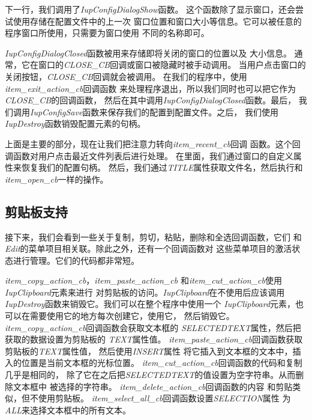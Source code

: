 \documentclass{ctexart}
\begin{document}
下一行，我们调用了\emph{IupConfigDialogShow}函数。
这个函数除了显示窗口，还会尝试使用存储在配置文件中的上一次
窗口位置和窗口大小等信息。它可以被任意的程序窗口所使用，只需要为窗口使用
不同的名称即可。

\emph{IupConfigDialogClosed}函数被用来存储即将关闭的窗口的位置以及
大小信息。
通常，它在窗口的\emph{CLOSE\_CB}回调或窗口被隐藏时被手动调用。
当用户点击窗口的关闭按钮，\emph{CLOSE\_CB}回调就会被调用。
在我们的程序中，使用\emph{item\_exit\_action\_cb}回调函数
来处理程序退出，所以我们同时也可以把它作为\emph{CLOSE\_CB}的回调函数，
然后在其中调用\emph{IupConfigDialogClosed}函数。最后，
我们调用\emph{IupConfigSave}函数来保存我们的配置到配置文件。之后，
我们使用\emph{IupDestroy}函数销毁配置元素的句柄。

上面是主要的部分，现在让我们把注意力转向\emph{item\_recent\_cb}回调
函数。这个回调函数对用户点击最近文件列表后进行处理。
在里面，我们通过窗口的自定义属性来恢复我们的配置句柄。
然后，我们通过\emph{TITLE}属性获取文件名，然后执行和
\emph{item\_open\_cb}一样的操作。

\subsection{剪贴板支持}

接下来，我们会看到一些关于复制，剪切，粘贴，删除和全选回调函数，它们
和\emph{Edit}的菜单项目相关联。除此之外，还有一个回调函数对
这些菜单项目的激活状态进行管理。它们的代码都非常短。

\emph{item\_copy\_action\_cb}，\emph{item\_paste\_action\_cb}
和\emph{item\_cut\_action\_cb}使用\emph{IupClipboard}元素来进行
对剪贴板的访问。\emph{IupClipboard}在不使用后应该调用
\emph{IupDestroy}函数来销毁它。我们可以在整个程序中使用一个
\emph{IupClipboard}元素，也可以在需要使用它的地方每次创建它，使用它，
然后销毁它。
\emph{item\_copy\_action\_cb}回调函数会获取文本框的
\emph{SELECTEDTEXT}属性，然后把获取的数据设置为剪贴板的
\emph{TEXT}属性值。
\emph{item\_paste\_action\_cb}回调函数获取剪贴板的\emph{TEXT}属性值，
然后使用\emph{INSERT}属性
将它插入到文本框的文本中，插入的位置是当前文本框的光标位置。
\emph{item\_cut\_action\_cb}回调函数的代码和复制几乎是相同的，
除了它在之后把\emph{SELECTEDTEXT}的值设置为空字符串。从而删除文本框中
被选择的字符串。
\emph{item\_delete\_action\_cb}回调函数的内容
和剪贴类似，但不使用剪贴板。
\emph{item\_select\_all\_cb}回调函数设置\emph{SELECTION}属性
为\emph{ALL}来选择文本框中的所有文本。
\end{document}
